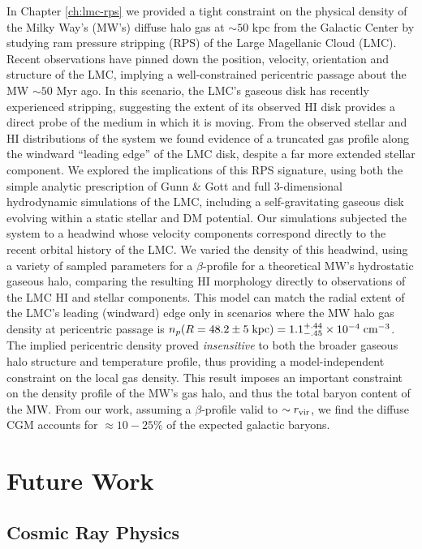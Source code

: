 In Chapter \ref{ch:lmc-rps} we provided a tight constraint on the physical density of the Milky Way's (MW's) diffuse halo gas at $\sim 50$ kpc from the Galactic Center by studying ram pressure stripping (RPS) of the Large Magellanic Cloud (LMC). Recent observations have pinned down the position, velocity, orientation and structure of the LMC, implying a well-constrained pericentric passage about the MW $\sim 50$ Myr ago. In this scenario, the LMC's gaseous disk has recently experienced stripping, suggesting the extent of its observed HI disk provides a direct probe of the medium in which it is moving.  From the observed stellar and HI distributions of the system we found evidence of a truncated gas profile along the windward ``leading edge'' of the LMC disk, despite a far more extended stellar component. We explored the implications of this RPS signature, using both the simple analytic prescription of Gunn \& Gott and  full 3-dimensional hydrodynamic simulations of the LMC, including a self-gravitating gaseous disk evolving within a static stellar and DM potential. Our simulations subjected the system to a headwind whose velocity components correspond directly to the recent orbital history of the LMC. We varied the density of this headwind, using a variety of sampled parameters for a $\beta$-profile for a theoretical MW's hydrostatic gaseous halo, comparing the resulting HI morphology directly to observations of the LMC HI and stellar components. This model can match the radial extent of the LMC's leading (windward) edge only in scenarios where the MW halo gas density at pericentric passage is $n_p(R = 48.2 \pm 5\;{\rm kpc}) = 1.1^{+.44}_{-.45} \times 10^{-4} \; {\rm cm}^{-3}$. The implied pericentric density proved \emph{insensitive} to both the broader gaseous halo structure and temperature profile, thus providing a model-independent constraint on the local gas density. This result imposes an important constraint on the density profile of the MW's gas halo, and thus the total baryon content of the MW. From our work, assuming a $\beta$-profile valid to $\sim r_{\rm vir}$, we find the diffuse CGM accounts for $\approx 10 - 25\%$ of the expected galactic baryons.

\section{Future Work}
\label{sec:future-work}

\subsection{Cosmic Ray Physics}
\label{sec:cr-physics}


